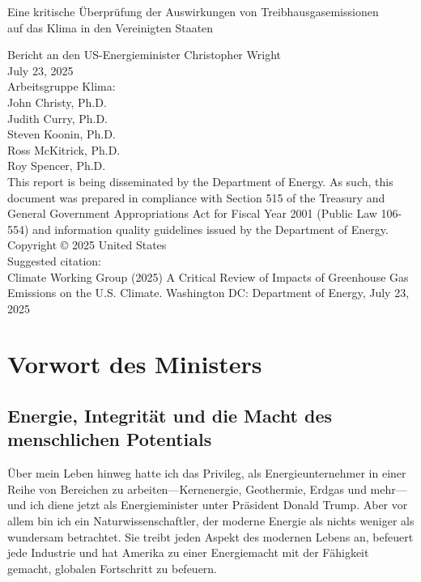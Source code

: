\documentclass[12pt,paper=a4,DIV=12,parskip=never,chapterprefix=false,headings=standardclasses]{scrreprt}
\makeatletter
\renewcommand*{\tableofcontents}{%
  \begingroup
    \small      %
    \sloppy     %
    \chapter*{\contentsname}%
    \@starttoc{toc}%
  \endgroup
}
\makeatother
\begin{document}
\begin{titlepage}
\centering
{\huge Eine kritische Überprüfung der Auswirkungen von Treibhausgasemissionen\\
auf das Klima in den Vereinigten Staaten\par}

\vspace{1.5cm}
\raggedright
{\Large Bericht an den US-Energieminister Christopher Wright}\\[2ex]
{\Large July 23, 2025}\\[2cm]

{\large Arbeitsgruppe Klima:}\\[0.7cm]
John Christy, Ph.D.\\
Judith Curry, Ph.D.\\
Steven Koonin, Ph.D.\\
Ross McKitrick, Ph.D.\\
Roy Spencer, Ph.D.\\[2cm]

This report is being disseminated by the Department of Energy. As such, this document was prepared
in compliance with Section 515 of the Treasury and General Government Appropriations Act for
Fiscal Year 2001 (Public Law 106-554) and information quality guidelines issued by the Department
of Energy.\\[3ex]

Copyright © 2025 United States\\[3ex]

Suggested citation:\\[1ex]

Climate Working Group (2025) A Critical Review of Impacts of Greenhouse Gas Emissions on the
U.S. Climate. Washington DC: Department of Energy, July 23, 2025
\end{titlepage}

\newpage
\thispagestyle{empty}
\mbox{}
\newpage

\tableofcontents
\cleardoublepage
{}   %
\chapter*{Vorwort des Ministers}
\section*{Energie, Integrität und die Macht des menschlichen Potentials}
Über mein Leben hinweg hatte ich das Privileg, als Energieunternehmer in einer Reihe von Bereichen zu arbeiten—Kernenergie, Geothermie, Erdgas und mehr—und ich diene jetzt als Energieminister unter Präsident Donald Trump. Aber vor allem bin ich ein Naturwissenschaftler, der moderne Energie als nichts weniger als wundersam betrachtet. Sie treibt jeden Aspekt des modernen Lebens an, befeuert jede Industrie und hat Amerika zu einer Energiemacht mit der Fähigkeit gemacht, globalen Fortschritt zu befeuern.
\end{document}
